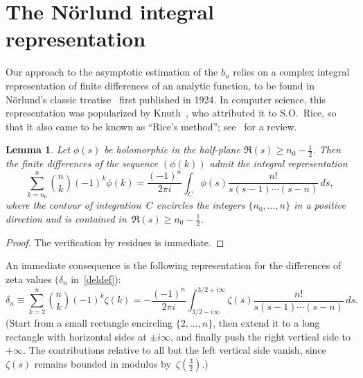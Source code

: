 \documentclass{amsart}
\newtheorem{lemma}{Lemma}
\begin{document}
\section{The N\"orlund integral representation}

Our approach to the asymptotic estimation of the $b_n$ relies on
a complex integral representation of finite differences of an analytic function,
to be found in N\"orlund's classic treatise~\cite[\S VIII.5]{Norlund54} first published in 1924.
In computer science, this representation was popularized by Knuth~\cite{Knuth98a},
who attributed it to S.O.~Rice, so that
it also came to be known as ``Rice's method''; see~\cite{FlSe95}
for  a review. 

\begin{lemma} Let $\phi(s)$ be holomorphic in the half-plane 
$\Re(s)\ge n_0-\frac12$. Then the finite differences of the sequence
$(\phi(k))$ admit the integral representation
\[
\sum_{k=n_0}^n \binom{n}{k}(-1)^k\phi(k)=\frac{(-1)^n}{2\pi i}\int_C 
\phi(s) \frac{n!}{s(s-1)\cdots(s-n)}\, ds,\]
where the contour of integration~$C$ encircles the integers $\{n_0,\ldots,n\}$
in a positive direction and is contained in~$\Re(s)\ge n_0-\frac12$.
\end{lemma}
\begin{proof}
The verification by residues is immediate.
\end{proof}

An immediate consequence is the following representation for the 
differences of zeta values ($\delta_n$ in~\eqref{deldef}):
\begin{equation}\label{norbn}
\delta_n\equiv \sum_{k=2}^n \binom{n}{k}(-1)^k\zeta(k)
=-\frac{(-1)^n}{2\pi i}\int_{3/2-i\infty}^{3/2+i\infty} 
\zeta(s) \frac{n!}{s(s-1)\cdots(s-n)}\, ds. 
\end{equation}
(Start from a small rectangle encircling $\{2,\ldots,n\}$, then 
extend it to a long rectangle with horizontal sides at $\pm i\infty$,
and finally push the right vertical side to $+\infty$.
The contributions relative to 
all but the left vertical side vanish,
since $\zeta(s)$ remains bounded in modulus by~$\zeta(\frac32)$.)
\end{document}
